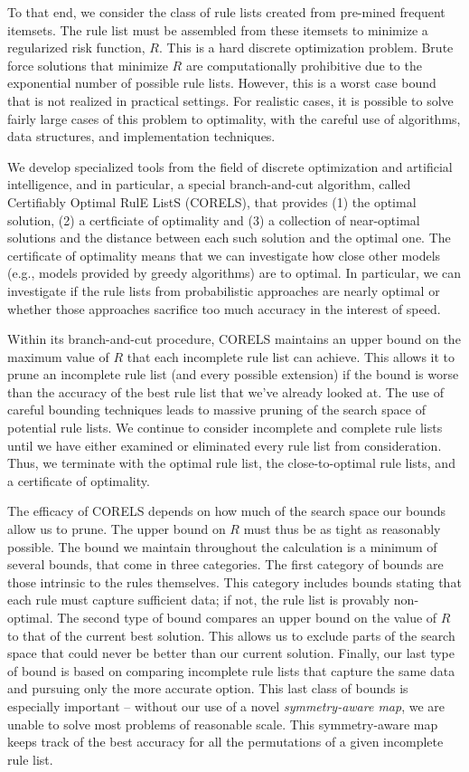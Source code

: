 To that end, we consider the class of rule lists created from pre-mined frequent itemsets. The rule list must be assembled from these itemsets to minimize a regularized risk function, $R$. This is a hard discrete optimization problem. Brute force solutions that minimize $R$ are computationally prohibitive due to the exponential number of possible rule lists. However, this is a worst case bound that is not realized in practical settings. For realistic cases, it is possible to solve fairly large cases of this problem to optimality, with the careful use of algorithms, data structures, and implementation techniques.

We develop specialized tools from the field of discrete optimization and artificial intelligence, and in particular, a special branch-and-cut algorithm, called  Certifiably Optimal RulE ListS (CORELS), that provides (1) the optimal solution, (2) a certficiate of optimality and (3) a collection of near-optimal solutions and the distance between each such solution and the optimal one. The certificate of optimality means that we can investigate how close other models (e.g., models provided by greedy algorithms) are to optimal. In particular, we can investigate if the rule lists from probabilistic approaches are nearly optimal or whether those approaches sacrifice too much accuracy in the interest of speed.

\begin{arxiv}
Within its branch-and-cut procedure, CORELS maintains an upper bound on the maximum value of $R$ that each incomplete rule list can achieve. This allows it to prune an incomplete rule list (and every possible extension) if the bound is worse than the accuracy of the best rule list that we've already looked at. The use of careful bounding techniques leads to massive pruning of the search space of potential rule lists. We continue to consider incomplete and complete rule lists until we have either examined or eliminated every rule list from consideration. Thus, we terminate with the optimal rule list, the close-to-optimal rule lists, and a certificate of optimality.
\end{arxiv}

The efficacy of CORELS depends on how much of the search space our bounds allow us to prune. The upper bound on $R$ must thus be as tight as reasonably possible. The bound we maintain throughout the calculation is a minimum of several bounds, that come in three categories. The first category of bounds are those intrinsic to the rules themselves. This category includes bounds stating that each rule must capture sufficient data; if not, the rule list is provably non-optimal. The second type of bound compares an upper bound on the value of $R$ to that of the current best solution. This allows us to exclude parts of the search space that could never be better than our current solution. Finally, our last type of bound is based on comparing incomplete rule lists that capture the same data and pursuing only the more accurate option. This last class of bounds is especially important -- without our use of a novel \textit{symmetry-aware map}, we are unable to solve most problems of reasonable scale. This symmetry-aware map keeps track of the best accuracy for all the permutations of a given incomplete rule list.

